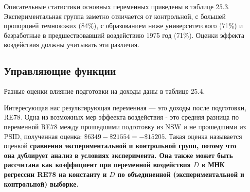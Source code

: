 Описательные статистики основных переменных приведены в таблице 25.3. Экспериментальная группа заметно отличается от контрольной, с большей пропорцией темнокожих (84\%), с образованием ниже университетского (71\%) и безработные в предшествовавший воздействию 1975 год (71\%). Оценки эффекта воздействия должны учитывать эти различия. 

\subsection{Управляющие функции}

Разные оценки влияние подготовки на доходы даны в таблице 25.4. 

Интересующая нас результирующая переменная --- это доходы после подготовки, RE78. Одна из возможных мер эффеекта воздействия - это средняя разница по переменной RE78 между прошедшими подготовку из NSW и не прошедшими из PSID, полученная оценка: $\$ 6 349 - \$ 21 554 = - \$ 15 205$. Такая оценка называется оценкой \bfseries сравнения экспериментальной и контрольной групп, \mdseries потому что она дублирует анализ в условиях эксперимента. Она также может быть рассчитана как коэффициент при переменной воздействия $D$ в МНК регрессии RE78 на константу и $D$ по объединенной (экспериментальной и контрольной) выборке. 

